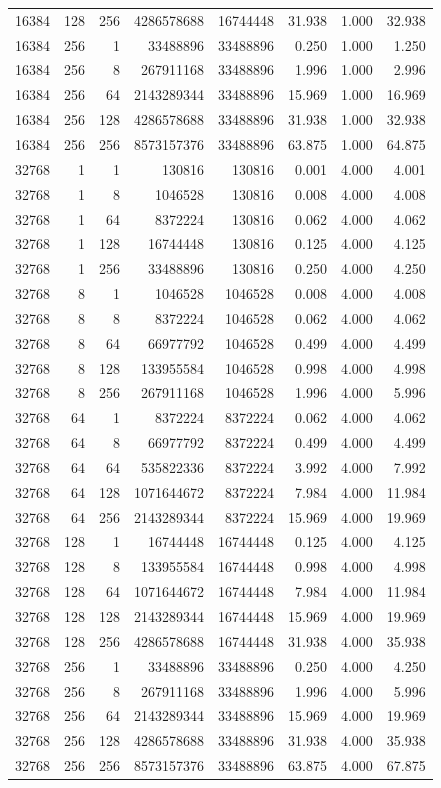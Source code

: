 \begin{longtable}{rrrrrrrr}
16384 & 128 & 256 & 4286578688 & 16744448 & 31.938 & 1.000 & 32.938\\
16384 & 256 & 1 & 33488896 & 33488896 & 0.250 & 1.000 & 1.250\\
16384 & 256 & 8 & 267911168 & 33488896 & 1.996 & 1.000 & 2.996\\
16384 & 256 & 64 & 2143289344 & 33488896 & 15.969 & 1.000 & 16.969\\
16384 & 256 & 128 & 4286578688 & 33488896 & 31.938 & 1.000 & 32.938\\
16384 & 256 & 256 & 8573157376 & 33488896 & 63.875 & 1.000 & 64.875\\
32768 & 1 & 1 & 130816 & 130816 & 0.001 & 4.000 & 4.001\\
32768 & 1 & 8 & 1046528 & 130816 & 0.008 & 4.000 & 4.008\\
32768 & 1 & 64 & 8372224 & 130816 & 0.062 & 4.000 & 4.062\\
32768 & 1 & 128 & 16744448 & 130816 & 0.125 & 4.000 & 4.125\\
32768 & 1 & 256 & 33488896 & 130816 & 0.250 & 4.000 & 4.250\\
32768 & 8 & 1 & 1046528 & 1046528 & 0.008 & 4.000 & 4.008\\
32768 & 8 & 8 & 8372224 & 1046528 & 0.062 & 4.000 & 4.062\\
32768 & 8 & 64 & 66977792 & 1046528 & 0.499 & 4.000 & 4.499\\
32768 & 8 & 128 & 133955584 & 1046528 & 0.998 & 4.000 & 4.998\\
32768 & 8 & 256 & 267911168 & 1046528 & 1.996 & 4.000 & 5.996\\
32768 & 64 & 1 & 8372224 & 8372224 & 0.062 & 4.000 & 4.062\\
32768 & 64 & 8 & 66977792 & 8372224 & 0.499 & 4.000 & 4.499\\
32768 & 64 & 64 & 535822336 & 8372224 & 3.992 & 4.000 & 7.992\\
32768 & 64 & 128 & 1071644672 & 8372224 & 7.984 & 4.000 & 11.984\\
32768 & 64 & 256 & 2143289344 & 8372224 & 15.969 & 4.000 & 19.969\\
32768 & 128 & 1 & 16744448 & 16744448 & 0.125 & 4.000 & 4.125\\
32768 & 128 & 8 & 133955584 & 16744448 & 0.998 & 4.000 & 4.998\\
32768 & 128 & 64 & 1071644672 & 16744448 & 7.984 & 4.000 & 11.984\\
32768 & 128 & 128 & 2143289344 & 16744448 & 15.969 & 4.000 & 19.969\\
32768 & 128 & 256 & 4286578688 & 16744448 & 31.938 & 4.000 & 35.938\\
32768 & 256 & 1 & 33488896 & 33488896 & 0.250 & 4.000 & 4.250\\
32768 & 256 & 8 & 267911168 & 33488896 & 1.996 & 4.000 & 5.996\\
32768 & 256 & 64 & 2143289344 & 33488896 & 15.969 & 4.000 & 19.969\\
32768 & 256 & 128 & 4286578688 & 33488896 & 31.938 & 4.000 & 35.938\\
32768 & 256 & 256 & 8573157376 & 33488896 & 63.875 & 4.000 & 67.875\\
\end{longtable}
